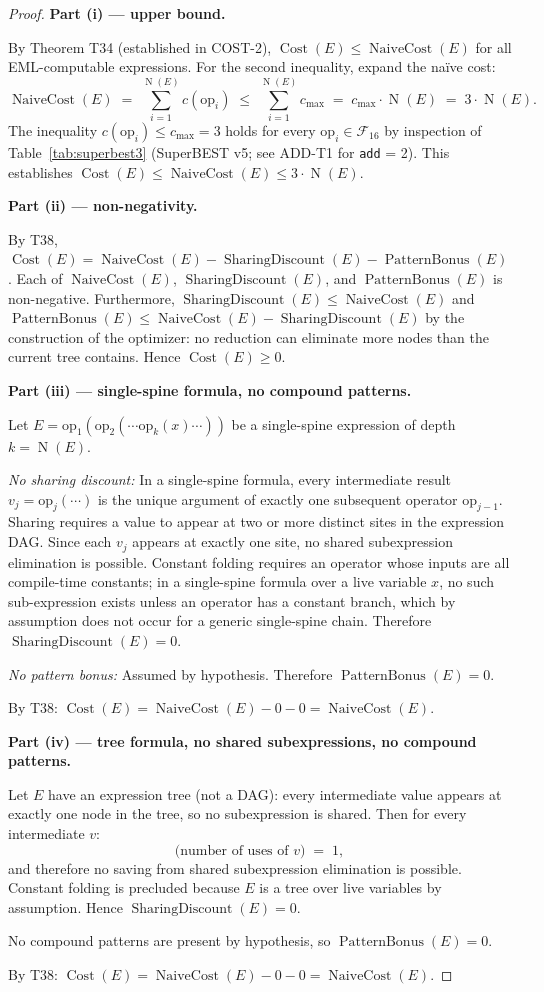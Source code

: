 \documentclass[12pt,a4paper]{article}
\theoremstyle{definition}
\newcommand{\Cost}{\operatorname{Cost}}
\newcommand{\NC}{\operatorname{NaiveCost}}
\newcommand{\SD}{\operatorname{SharingDiscount}}
\newcommand{\PB}{\operatorname{PatternBonus}}
\newcommand{\NOp}{\operatorname{N}}
\begin{document}
\begin{proof}
\textbf{Part (i) --- upper bound.}

By Theorem T34 (established in COST-2), $\Cost(E) \leq \NC(E)$ for all
EML-computable expressions.  For the second inequality, expand the na\"{i}ve
cost:
\[
  \NC(E) \;=\; \sum_{i=1}^{\NOp(E)} c(\mathrm{op}_i)
          \;\leq\; \sum_{i=1}^{\NOp(E)} c_{\max}
          \;=\; c_{\max} \cdot \NOp(E)
          \;=\; 3 \cdot \NOp(E).
\]
The inequality $c(\mathrm{op}_i) \leq c_{\max} = 3$ holds for every
$\mathrm{op}_i \in \mathcal{F}_{16}$ by inspection of
Table~\ref{tab:superbest3} (SuperBEST v5; see ADD-T1 for \texttt{add} = 2).
This establishes $\Cost(E) \leq \NC(E) \leq 3 \cdot \NOp(E)$.

\bigskip
\textbf{Part (ii) --- non-negativity.}

By T38, $\Cost(E) = \NC(E) - \SD(E) - \PB(E)$.  Each of $\NC(E)$, $\SD(E)$,
and $\PB(E)$ is non-negative.  Furthermore, $\SD(E) \leq \NC(E)$ and
$\PB(E) \leq \NC(E) - \SD(E)$ by the construction of the optimizer: no
reduction can eliminate more nodes than the current tree contains.  Hence
$\Cost(E) \geq 0$.

\bigskip
\textbf{Part (iii) --- single-spine formula, no compound patterns.}

Let $E = \mathrm{op}_1(\mathrm{op}_2(\cdots \mathrm{op}_k(x) \cdots))$ be a
single-spine expression of depth $k = \NOp(E)$.

\emph{No sharing discount:}  In a single-spine formula, every intermediate
result $v_j = \mathrm{op}_j(\cdots)$ is the unique argument of exactly one
subsequent operator $\mathrm{op}_{j-1}$.  Sharing requires a value to appear
at two or more distinct sites in the expression DAG.  Since each $v_j$
appears at exactly one site, no shared subexpression elimination is possible.
Constant folding requires an operator whose inputs are all compile-time
constants; in a single-spine formula over a live variable $x$, no such
sub-expression exists unless an operator has a constant branch, which by
assumption does not occur for a generic single-spine chain.
Therefore $\SD(E) = 0$.

\emph{No pattern bonus:}  Assumed by hypothesis.  Therefore $\PB(E) = 0$.

By T38: $\Cost(E) = \NC(E) - 0 - 0 = \NC(E)$.

\bigskip
\textbf{Part (iv) --- tree formula, no shared subexpressions, no compound
patterns.}

Let $E$ have an expression tree (not a DAG): every intermediate value appears
at exactly one node in the tree, so no subexpression is shared.  Then for
every intermediate $v$:
\[
  \text{(number of uses of } v\text{)} \;=\; 1,
\]
and therefore no saving from shared subexpression elimination is possible.
Constant folding is precluded because $E$ is a tree over live variables by
assumption.  Hence $\SD(E) = 0$.

No compound patterns are present by hypothesis, so $\PB(E) = 0$.

By T38: $\Cost(E) = \NC(E) - 0 - 0 = \NC(E)$.
\end{proof}
\end{document}
